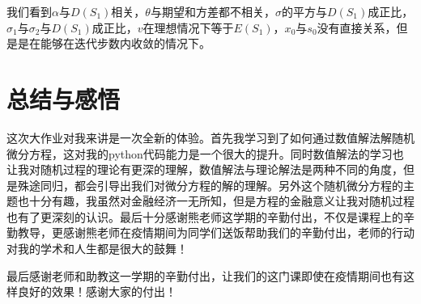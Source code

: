 \documentclass{article}
\begin{document}
我们看到$\alpha$与$D(S_1)$相关，$\theta$与期望和方差都不相关，$\sigma$的平方与$D(S_1)$成正比，$\sigma_1$与$\sigma_2$与$D(S_1)$成正比，$v$在理想情况下等于$E(S_1)$，$x_0$与$s_0$没有直接关系，但是是在能够在迭代步数内收敛的情况下。






\section{总结与感悟}
这次大作业对我来讲是一次全新的体验。首先我学习到了如何通过数值解法解随机微分方程，这对我的python代码能力是一个很大的提升。同时数值解法的学习也让我对随机过程的理论有更深的理解，数值解法与理论解法是两种不同的角度，但是殊途同归，都会引导出我们对微分方程的解的理解。另外这个随机微分方程的主题也十分有趣，我虽然对金融经济一无所知，但是方程的金融意义让我对随机过程也有了更深刻的认识。最后十分感谢熊老师这学期的辛勤付出，不仅是课程上的辛勤教导，更感谢熊老师在疫情期间为同学们送饭帮助我们的辛勤付出，老师的行动对我的学术和人生都是很大的鼓舞！

最后感谢老师和助教这一学期的辛勤付出，让我们的这门课即使在疫情期间也有这样良好的效果！感谢大家的付出！






% 
% 
\end{document}

